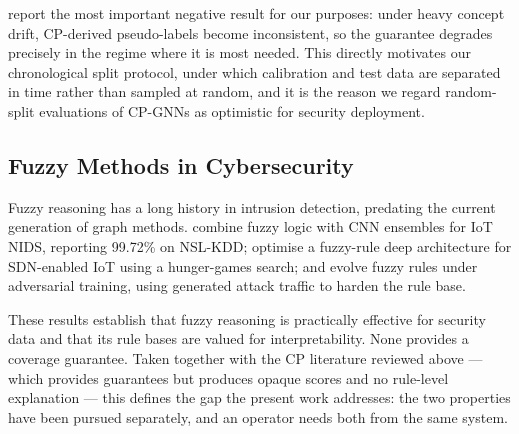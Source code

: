\citet{cp_drift} report the most important negative result for our purposes:
under heavy concept drift, CP-derived pseudo-labels become inconsistent, so the
guarantee degrades precisely in the regime where it is most needed. This
directly motivates our chronological split protocol, under which calibration and
test data are separated in time rather than sampled at random, and it is the
reason we regard random-split evaluations of CP-GNNs as optimistic for security
deployment.

\subsection{Fuzzy Methods in Cybersecurity}

Fuzzy reasoning has a long history in intrusion detection, predating the current
generation of graph methods. \citet{fuzzy_iot} combine fuzzy logic with CNN
ensembles for IoT NIDS, reporting 99.72\% on NSL-KDD; \citet{fuzzy_sdn} optimise
a fuzzy-rule deep architecture for SDN-enabled IoT using a hunger-games search;
and \citet{gfs_gan} evolve fuzzy rules under adversarial training, using
generated attack traffic to harden the rule base.

These results establish that fuzzy reasoning is practically effective for
security data and that its rule bases are valued for interpretability. None
provides a coverage guarantee. Taken together with the CP literature reviewed
above — which provides guarantees but produces opaque scores and no rule-level
explanation — this defines the gap the present work addresses: the two
properties have been pursued separately, and an operator needs both from the
same system.
